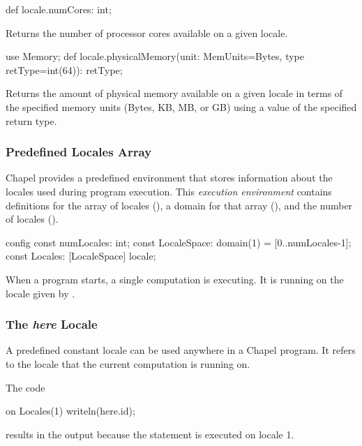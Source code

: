 \begin{protohead}
def locale.numCores: int;
\end{protohead}
\begin{protobody}
Returns the number of processor cores available on a given locale.
\end{protobody}

\begin{protohead}
use Memory;
def locale.physicalMemory(unit: MemUnits=Bytes, type retType=int(64)): retType;
\end{protohead}
\begin{protobody}
Returns the amount of physical memory available on a given locale in
terms of the specified memory units (Bytes, KB, MB, or GB) using a
value of the specified return type.
\end{protobody}

\subsubsection{Predefined Locales Array}
\label{Predefined_Locales_Array}

Chapel provides a predefined environment that stores information about
the locales used during program execution.  This {\em execution
environment} contains definitions for the array of locales
(), a domain for that array (), and
the number of locales ().
\begin{chapel}
config const numLocales: int;
const LocaleSpace: domain(1) = [0..numLocales-1];
const Locales: [LocaleSpace] locale;
\end{chapel}
When a program starts, a single computation is executing.  It is
running on the locale given by .

\subsubsection{The {\em here} Locale}
\label{here}

A predefined constant locale  can be used anywhere in a
Chapel program.  It refers to the locale that the current computation
is running on.

\begin{example}
The code
\begin{chapel}
on Locales(1) {
  writeln(here.id);
}
\end{chapel}
results in the output  because the  statement is
executed on locale 1.
\end{example}

